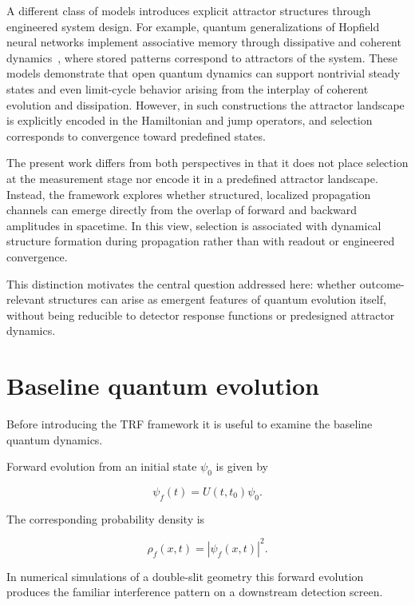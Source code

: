 \documentclass[aps,prl,reprint]{revtex4-2}
\begin{document}
A different class of models introduces explicit attractor
structures through engineered system design. For example,
quantum generalizations of Hopfield neural networks implement
associative memory through dissipative and coherent dynamics~\cite{rotondo2017},
where stored patterns correspond to attractors of the system.
These models demonstrate that open quantum dynamics can support
nontrivial steady states and even limit-cycle behavior arising
from the interplay of coherent evolution and dissipation.
However, in such constructions the attractor landscape is
explicitly encoded in the Hamiltonian and jump operators,
and selection corresponds to convergence toward predefined
states.

The present work differs from both perspectives in that it does
not place selection at the measurement stage nor encode it in a
predefined attractor landscape. Instead, the framework explores
whether structured, localized propagation channels can emerge
directly from the overlap of forward and backward amplitudes in
spacetime. In this view, selection is associated with dynamical
structure formation during propagation rather than with readout
or engineered convergence.

This distinction motivates the central question addressed here:
whether outcome-relevant structures can arise as emergent features
of quantum evolution itself, without being reducible to detector
response functions or predesigned attractor dynamics.


\section{Baseline quantum evolution}

Before introducing the TRF framework it is useful to examine the
baseline quantum dynamics.

Forward evolution from an initial state $\psi_0$ is given by

\begin{equation}
\psi_f(t) = U(t,t_0)\psi_0 .
\end{equation}

The corresponding probability density is

\begin{equation}
\rho_f(x,t) = |\psi_f(x,t)|^2 .
\end{equation}

In numerical simulations of a double-slit geometry this
forward evolution produces the familiar interference pattern
on a downstream detection screen.
\end{document}
